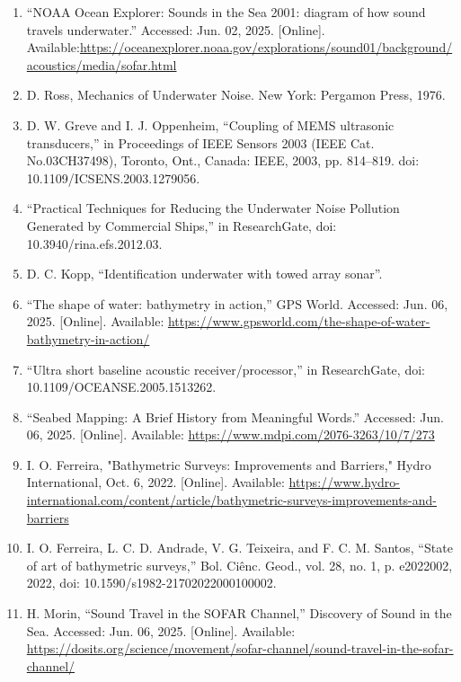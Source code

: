 \documentclass{article}
\begin{document}
\begin{sloppypar}
\begin{enumerate}
    \item{“NOAA Ocean Explorer: Sounds in the Sea 2001: diagram of how sound travels underwater.” Accessed: Jun. 02, 2025. [Online]. Available:\url{https://oceanexplorer.noaa.gov/explorations/sound01/background/acoustics/media/sofar.html}}


    \item{D. Ross, Mechanics of Underwater Noise. New York: Pergamon Press, 1976.}

    \item{D. W. Greve and I. J. Oppenheim, “Coupling of MEMS ultrasonic transducers,” in Proceedings of IEEE Sensors 2003 (IEEE Cat. No.03CH37498), Toronto, Ont., Canada: IEEE, 2003, pp. 814–819. doi: 10.1109/ICSENS.2003.1279056.}

    \item{“Practical Techniques for Reducing the Underwater Noise Pollution Generated by Commercial Ships,” in ResearchGate, doi: 10.3940/rina.efs.2012.03.}

    \item{D. C. Kopp, “Identification underwater with towed array sonar”.}

    \item{“The shape of water: bathymetry in action,” GPS World. Accessed: Jun. 06, 2025. [Online]. Available: \url{https://www.gpsworld.com/the-shape-of-water-bathymetry-in-action/}}

    \item{“Ultra short baseline acoustic receiver/processor,” in ResearchGate, doi: 10.1109/OCEANSE.2005.1513262.}

    \item{“Seabed Mapping: A Brief History from Meaningful Words.” Accessed: Jun. 06, 2025. [Online]. Available: \url{https://www.mdpi.com/2076-3263/10/7/273}}

    \item{I. O. Ferreira, "Bathymetric Surveys: Improvements and Barriers," Hydro International, Oct. 6, 2022. [Online]. Available: \url{https://www.hydro-international.com/content/article/bathymetric-surveys-improvements-and-barriers}}

    \item{I. O. Ferreira, L. C. D. Andrade, V. G. Teixeira, and F. C. M. Santos, “State of art of bathymetric surveys,” Bol. Ciênc. Geod., vol. 28, no. 1, p. e2022002, 2022, doi: 10.1590/s1982-21702022000100002.}

    \item{H. Morin, “Sound Travel in the SOFAR Channel,” Discovery of Sound in the Sea. Accessed: Jun. 06, 2025. [Online]. Available: \url{https://dosits.org/science/movement/sofar-channel/sound-travel-in-the-sofar-channel/}}


\end{enumerate}
\end{sloppypar}
\end{document}
